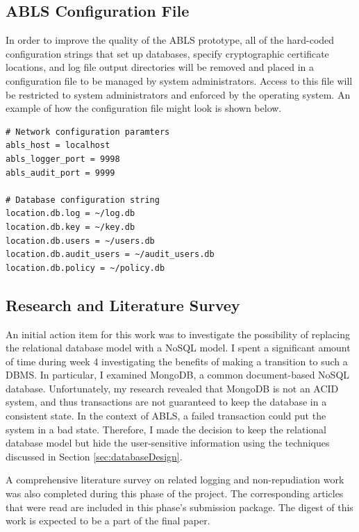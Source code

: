 \documentclass{sig-alternate}
\begin{document}
\subsection{ABLS Configuration File} 
In order to improve the quality of the ABLS prototype, all of the hard-coded configuration strings that set up databases,
specify cryptographic certificate locations, and log file output directories will be removed and placed in a configuration file
to be managed by system administrators. Access to this file will be restricted to system administrators and enforced by the 
operating system. An example of how the configuration file might look is shown below.

\begin{lstlisting}
# Network configuration paramters
abls_host = localhost
abls_logger_port = 9998
abls_audit_port = 9999

# Database configuration string
location.db.log = ~/log.db
location.db.key = ~/key.db
location.db.users = ~/users.db
location.db.audit_users = ~/audit_users.db
location.db.policy = ~/policy.db
\end{lstlisting}

\subsection{Research and Literature Survey}
An initial action item for this work was to investigate the possibility of replacing the relational database model with a 
NoSQL model. I spent a significant amount of time during week 4 investigating the benefits of making a transition
to such a DBMS. In particular, I examined MongoDB, a common document-based NoSQL database. Unfortunately,
my research revealed that MongoDB is not an ACID system, and thus transactions are not guaranteed to keep the
database in a consistent state. In the context of ABLS, a failed transaction could put the system in a bad state. Therefore,
I made the decision to keep the relational database model but hide the user-sensitive information using the techniques
discussed in Section \ref{sec:databaseDesign}.

A comprehensive literature survey on related logging and non-repudiation work was also completed during this phase 
of the project. The corresponding articles that were read are included in this phase's submission package. The digest 
of this work is expected to be a part of the final paper.
\end{document}
